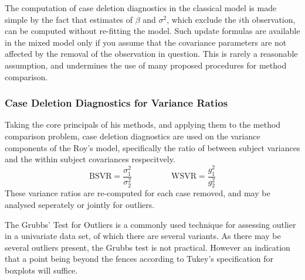 \documentclass[12pt, a4paper]{report}
\theoremstyle{plain}
\theoremstyle{definition}
\theoremstyle{remark}
\begin{document}
	The computation of case deletion diagnostics in the classical model is made simple by the fact that estimates of $\beta$ and $\sigma^2$, which exclude the $i$th observation, can be computed without re-fitting the model. Such update formulas are available in the mixed model only if you assume that the covariance parameters are not affected by the removal of the observation in question. This is rarely a reasonable assumption, and undermines the use of many proposed procedures for method comparison.

\subsubsection{Case Deletion Diagnostics for Variance Ratios}
Taking the core principals of his methods, and applying them to the method comparison problem, case deletion diagnostics are used on the variance components of the Roy's model, specifically the ratio of between subject variances and the within subject covariances respecitvely.
\[ \mbox{BSVR} = \frac{\sigma^2_1}{\sigma^2_2} \phantom{makespace}  \mbox{WSVR} = \frac{g^2_1}{g^2_2} \]
These variance ratios are re-computed for each case removed, and may be analysed seperately or jointly for outliers.
	
The Grubbs' Test for Outliers is a commonly used technique for assessing outlier in a univariate data set, of which there are several variants. As there may be several outliers present, the Grubbs test is not practical. However an indication that a point being beyond the fences according to Tukey's specification for boxplots will suffice.
	
	
	
\end{document}
